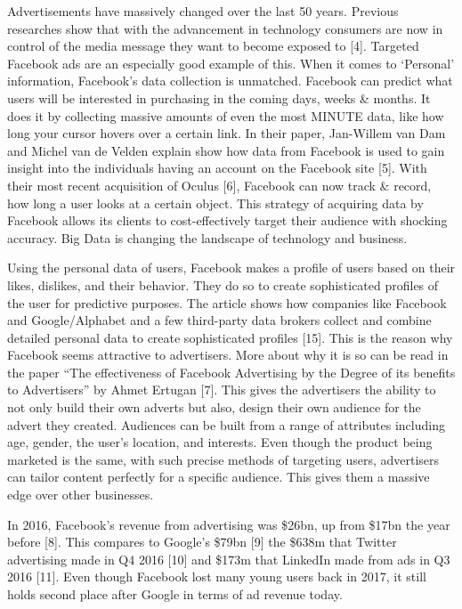 \documentclass[
]{article}
\begin{document}
Advertisements have massively changed over the last 50 years. Previous
researches show that with the advancement in technology consumers are
now in control of the media message they want to become exposed to
{[}4{]}. Targeted Facebook ads are an especially good example of this.
When it comes to `Personal' information, Facebook's data collection is
unmatched. Facebook can predict what users will be interested in
purchasing in the coming days, weeks \& months. It does it by collecting
massive amounts of even the most MINUTE data, like how long your cursor
hovers over a certain link. In their paper, Jan-Willem van Dam and
Michel van de Velden explain show how data from Facebook is used to gain
insight into the individuals having an account on the Facebook site
{[}5{]}. With their most recent acquisition of Oculus {[}6{]}, Facebook
can now track \& record, how long a user looks at a certain object. This
strategy of acquiring data by Facebook allows its clients to
cost-effectively target their audience with shocking accuracy. Big Data
is changing the landscape of technology and business.

Using the personal data of users, Facebook makes a profile of users
based on their likes, dislikes, and their behavior. They do so to create
sophisticated profiles of the user for predictive purposes. The article
shows how companies like Facebook and Google/Alphabet and a few
third-party data brokers collect and combine detailed personal data to
create sophisticated profiles {[}15{]}. This is the reason why Facebook
seems attractive to advertisers. More about why it is so can be read in
the paper ``The effectiveness of Facebook Advertising by the Degree of
its benefits to Advertisers'' by Ahmet Ertugan {[}7{]}. This gives the
advertisers the ability to not only build their own adverts but also,
design their own audience for the advert they created. Audiences can be
built from a range of attributes including age, gender, the user's
location, and interests. Even though the product being marketed is the
same, with such precise methods of targeting users, advertisers can
tailor content perfectly for a specific audience. This gives them a
massive edge over other businesses.

In 2016, Facebook's revenue from advertising was \$26bn, up from \$17bn
the year before {[}8{]}. This compares to Google's \$79bn {[}9{]} the
\$638m that Twitter advertising made in Q4 2016 {[}10{]} and \$173m that
LinkedIn made from ads in Q3 2016 {[}11{]}. Even though Facebook lost
many young users back in 2017, it still holds second place after Google
in terms of ad revenue today.
\end{document}
